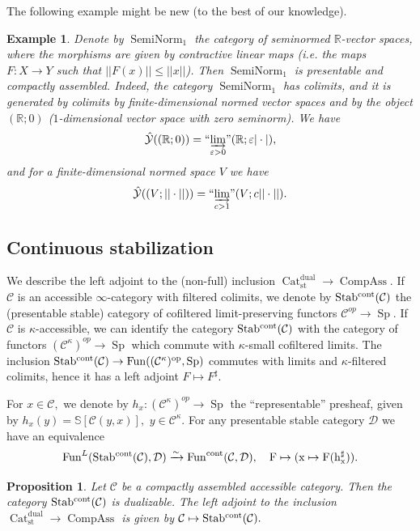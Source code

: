 \documentclass[11pt,leqno]{amsart}
\newtheorem{prop}[theo]{Proposition}
\newtheorem{example}[theo]{Example}
\numberwithin{equation}{section}
\def\R{\mathbb{R}}
\def\bS{\mathbb{S}}
\newcommand{\indlim}[1][]{\mathop{\varinjlim}\limits_{#1}}
\newcommand{\inddlim}[1][]{{``{\indlim[#1]}"}}
\newcommand{\xto}{\xrightarrow}
\newcommand{\Cat}{\operatorname{Cat}}
\newcommand{\cont}{\operatorname{cont}}
\newcommand{\st}{\operatorname{st}}
\newcommand{\dual}{\operatorname{dual}}
\newcommand{\cD}{{\mathcal D}}
\newcommand{\cC}{{\mathcal C}}
\newcommand{\cY}{{\mathcal Y}}
\newcommand{\veps}{\varepsilon}
\newcommand{\Compass}{\operatorname{CompAss}}
\newcommand{\seminorm}{\operatorname{SemiNorm}}
\newcommand{\Fun}{\operatorname{Fun}}
\newcommand{\Sp}{\operatorname{Sp}}
\newcommand{\Stab}{\rm Stab}
\begin{document}
The following example might be new (to the best of our knowledge).

\begin{example}\label{ex:seminorm} Denote by $\seminorm_1$ the category of seminormed $\R$-vector spaces, where the morphisms are given by contractive linear maps (i.e. the maps $F:X\to Y$ such that $||F(x)||\leq ||x||$). Then $\seminorm_1$ is presentable and compactly assembled. Indeed, the category $\seminorm_1$ has colimits, and it is generated by colimits  by finite-dimensional {\it normed} vector spaces and by the object $(\R;0)$ ($1$-dimensional vector space with zero seminorm). We have $$\hat{\cY}((\R;0))=\inddlim[\veps>0](\R;\veps |\cdot|),$$
and for a finite-dimensional normed space $V$ we have 
$$\hat{\cY}((V;||\cdot||))=\inddlim[c>1](V;c||\cdot||).$$\end{example}

\subsection{Continuous stabilization}
\label{ssec:cont_stab}

We describe the left adjoint to the (non-full) inclusion $\Cat_{\st}^{\dual}\to\Compass.$ If $\cC$ is an accessible $\infty$-category with filtered colimits, we denote by $\Stab^{\cont}(\cC)$ the (presentable stable) category of cofiltered limit-preserving functors $\cC^{op}\to\Sp.$ If $\cC$ is $\kappa$-accessible, we can identify the category $\Stab^{\cont}(\cC)$ with the category of functors $(\cC^{\kappa})^{op}\to\Sp$ which commute with $\kappa$-small cofiltered limits. The inclusion $\Stab^{\cont}(\cC)\to\Fun((\cC^{\kappa})^{op},\Sp)$ commutes with limits and $\kappa$-filtered colimits, hence it has a left adjoint $F\mapsto F^{\sharp}.$

For $x\in\cC,$ we denote by $h_x:(\cC^{\kappa})^{op}\to\Sp$ the ``representable'' presheaf, given by $h_x(y)=\bS[\cC(y,x)],$ $y\in\cC^{\kappa}.$ For any presentable stable category $\cD$ we have an equivalence
\begin{equation}\label{eq:cont_stab_general} \Fun^{L}(\Stab^{\cont}(\cC),\cD)\xto{\sim} \Fun^{\cont}(\cC,\cD),\quad F\mapsto(x\mapsto F(h_x^{\sharp})).\end{equation}

\begin{prop}\label{prop:continuous_stab}Let $\cC$ be a compactly assembled accessible category. Then the category $\Stab^{\cont}(\cC)$ is dualizable. The left adjoint to the inclusion $\Cat_{\st}^{\dual}\to \Compass$ is given by $\cC\mapsto\Stab^{\cont}(\cC).$\end{prop}
\end{document}
